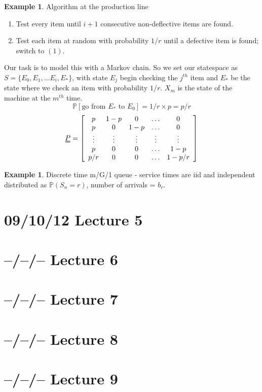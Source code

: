 \documentclass{article}
\theoremstyle{definition}
\newtheorem{ex}[thm]{Example}
\begin{document}
\begin{ex}
Algorithm at the production line
\begin{enumerate}
\item
Test every item until $i+1$ consecutive non-deflective items are found.
\item
Test each item at random  with probability $1/r$ until a defective item is found; switch to $(1)$.
\end{enumerate}
Our task is to model this with a Markov chain. So we set our statespace as $S = \{E_0, E_1, \ldots E_i, E_{\ast} \}$, with state $E_j$ begin checking the $j^{th}$ item and $E_{\ast}$ be the state where we check an item with probability $1/r$. $X_m$ is the state of the machine at the $m^{th}$ time.
\[
\mathbb{P}[ \mbox{go from } E_{\ast} \mbox{ to } E_0 ] = 1/r \times p = p/r
\] 
\[
\uuline{P} = \left [ \begin{array}{ccccc} p & 1-p & 0 & \hdots & 0\\ p & 0 & 1 - p & \hdots & 0\\ \vdots & \vdots & \vdots & \vdots & \vdots\\ p & 0 & 0 & \hdots & 1 - p\\ p/r & 0 & 0 & \hdots & 1 - p/r \end{array} \right ]
\]
\end{ex}

\begin{ex} Discrete time m/G/1 queue - service times are iid and independent distributed as $\mathbb{P}(S_n = r)$, number of arrivals = $b_r$. 
\end{ex}

\section{09/10/12 Lecture 5}

\section{--/--/-- Lecture 6}

\section{--/--/-- Lecture 7}

\section{--/--/-- Lecture 8}

\section{--/--/-- Lecture 9}
\end{document}
